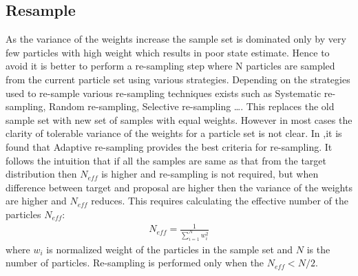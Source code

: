 \subsection{Resample}
As the variance of the weights increase the sample set is dominated only by very few particles with high weight which results in poor state estimate. Hence to avoid it is better to perform a re-sampling step where N particles are sampled from the current particle set using various strategies. Depending on the strategies used to re-sample various re-sampling techniques exists such as Systematic re-sampling, Random re-sampling, Selective re-sampling \dots. This replaces the old sample set with new set of samples with equal weights. However in most cases the clarity of tolerable variance of the weights for a particle set is not clear. In \cite{GMap_algo},it is found that Adaptive re-sampling provides the best criteria for re-sampling. It follows the intuition that if all the samples are same as that from the target distribution then ${N_{eff}}$ is higher and re-sampling is not required, but when difference between target and proposal are higher then the variance of the weights are higher and ${N_{eff}}$ reduces. This requires calculating the effective number of the particles ${N_{eff}}$:
\begin{gather} \label{Neff}
N_{eff} = \frac{1}{\sum_{i=1}^{N} w_{i}^{2} } 
\end{gather}
where ${w_{i}}$ is normalized weight of the particles in the sample set and ${N}$ is the number of particles.  Re-sampling is performed only 
when the ${N_{eff} < N/2}$.
